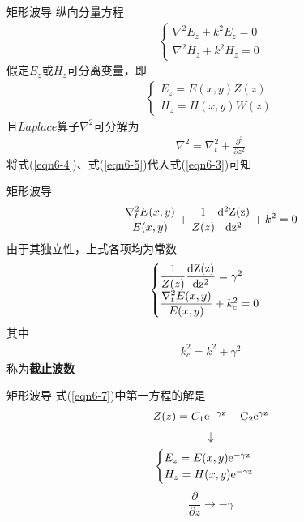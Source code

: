 \begin{frame}{矩形波导}
    纵向分量方程
    \begin{align}
        \begin{cases}
            \nabla^2E_z+k^2E_z=0 \\
            \nabla^2H_z+k^2H_z=0
        \end{cases}
        \label{eqn6-3}
    \end{align}
    假定$E_z$或$H_z$可分离变量，即
    \begin{align}
        \begin{cases}
            E_z=E(x,y)Z(z) \\
            H_z=H(x,y)W(z)
        \end{cases}
        \label{eqn6-4}
    \end{align}
    且$Laplace$算子$\nabla^2$可分解为
    \begin{align}
        \nabla^2=\nabla_t^2+\frac{\partial^2}{\partial z^2}
        \label{eqn6-5}
    \end{align}
    将式(\ref{eqn6-4})、式(\ref{eqn6-5})代入式(\ref{eqn6-3})可知
\end{frame}

\begin{frame}{矩形波导}
    \begin{align}
        \frac{\nabla^2_t E(x,y)}{E(x,y)}+\frac{1}{Z(z)}\frac{\rm{d}^2 Z(z)}{\rm{d}z^2}+k^2=0
        \label{eqn6-6}
    \end{align}
    由于其独立性，上式各项均为常数
    \begin{align}
        \begin{cases}
            \dfrac{1}{Z(z)}\dfrac{\rm{d}Z(z)}{\rm{d}z^2}=\gamma^2 \\
            \dfrac{\nabla_t^2E(x,y)}{E(x,y)}+k_c^2=0
        \end{cases}
        \label{eqn6-7}
    \end{align}
    其中
    \begin{align}
        k_c^2=k^2+\gamma^2
    \end{align}
    称为\textbf{截止波数}
\end{frame}

\begin{frame}{矩形波导}
    式(\ref{eqn6-7})中第一方程的解是
    \begin{align}
        Z(z)=C_1\rm{e}^{-\gamma z}+C_2\rm{e}^{\gamma z}
    \end{align}
    $$\downarrow$$
    \begin{align}
        \begin{cases}
            E_z=E(x,y)\rm{e}^{-\gamma z} \\
            H_z=H(x,y)\rm{e}^{-\gamma z}
        \end{cases}
    \end{align}
    $$\frac{\partial}{\partial z}\rightarrow -\gamma$$
\end{frame}

